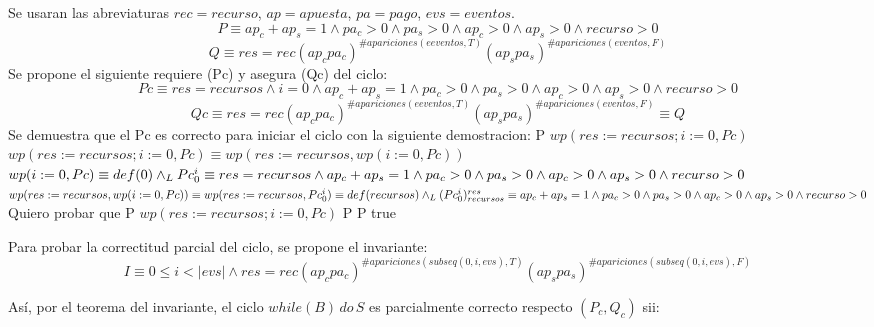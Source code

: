 \documentclass[10pt,a4paper]{article}
\begin{document}
Se usaran las abreviaturas $rec = recurso$, $ap = apuesta$, $pa = pago$, $evs = eventos$.\\
\begin{equation}
    P \equiv ap_c + ap_s = 1 \land pa_c > 0 \land pa_s > 0 \land ap_c > 0 \land ap_s > 0 \land recurso > 0
\end{equation}
\begin{equation}
    Q \equiv  res = rec (ap_c pa_c)^{\# apariciones(eeventos, T)}(ap_s pa_s)^{\#apariciones(eventos, F)}
\end{equation}
Se propone el siguiente requiere (Pc) y asegura (Qc) del ciclo:
\begin{equation}
    Pc \equiv res=recursos \land i=0 \land ap_c + ap_s = 1 \land pa_c > 0 \land pa_s > 0 \land ap_c > 0 \land ap_s > 0 \land recurso > 0
\end{equation}
\begin{equation}
    Qc \equiv res = rec (ap_c pa_c)^{\# apariciones(eeventos, T)}(ap_s pa_s)^{\#apariciones(eventos, F)} \equiv Q
\end{equation}
Se demuestra que el Pc es correcto para iniciar el ciclo con la siguiente demostracion: \newline P \implica $wp(res:=recursos;i:=0,Pc)$ \newline $wp(res:=recursos;i:=0,Pc) \equiv wp(res:=recursos,wp(i:=0,Pc))$ \newline $wp(i:=0,Pc) \equiv def(0) \land _L Pc_{0}^i \equiv res=recursos \land ap_c + ap_s = 1 \land pa_c > 0 \land pa_s > 0 \land ap_c > 0 \land ap_s > 0 \land recurso > 0$ \newline $wp(res:=recursos,wp(i:=0,Pc)) \equiv wp(res:=recursos,Pc_{0}^i) \equiv def(recursos) \land _L (Pc_{0}^i)_{recursos}^{res} \equiv ap_c + ap_s = 1 \land pa_c > 0 \land pa_s > 0 \land ap_c > 0 \land ap_s > 0 \land recurso > 0$ \newline
Quiero probar que \newline P \implica $wp(res:=recursos;i:=0,Pc)$ \newline \equiv P \implica P \equiv true \newline

Para probar la correctitud parcial del ciclo, se propone el invariante:
\begin{equation}
	I \equiv 0 \leq i < |evs| \wedge res = rec (ap_c pa_c)^{\# apariciones(subseq(0, i, evs), T)}(ap_s pa_s)^{\#apariciones(subseq(0, i, evs), F)}
\end{equation}	

Así, por el teorema del invariante, el ciclo $while(B) \, do \, S$ es parcialmente correcto respecto $(P_c, Q_c) $ sii:
\end{document}
